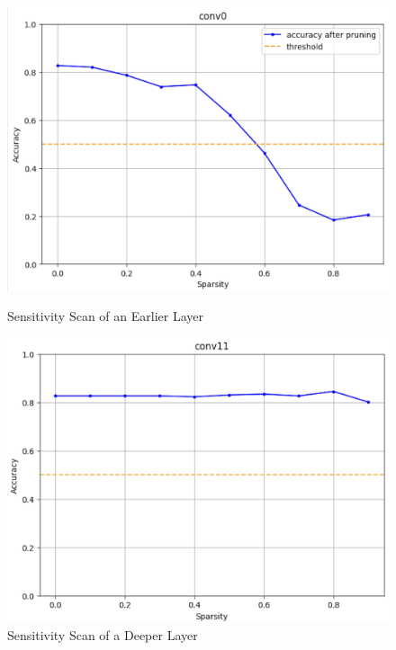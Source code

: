 \documentclass[12pt]{article}
\begin{document}
\begin{figure}[h]
\centering
\begin{minipage}{.4\textwidth}
  \centering
  \includegraphics[width=1\linewidth]{report_images/fine_change_egs.png}
  \caption{Sensitivity Scan of an Earlier Layer}
  \label{fig:fine_change_egs}
\end{minipage}
\hspace{1.5 cm}
\begin{minipage}{.4\textwidth}
  \centering
  \includegraphics[width=1\linewidth]{report_images/fine_no_change_egs.png}
  \caption{Sensitivity Scan of a Deeper Layer}
  \label{fig:fine_no_change_egs}
\end{minipage}%
\end{figure}
\end{document}
